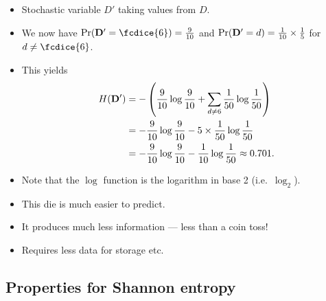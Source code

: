 \begin{frame}
  \begin{example}
    \begin{itemize}
      \item Stochastic variable \(D'\) taking values from \(D\).
      \item We now have \(\Pr(\stoch D' = \fcdice{6}) = \frac{9}{10}\) and 
        \(\Pr(\mathbf D' = d) = \frac{1}{10}\times\frac{1}{5}\) for \(d\neq 
          \fcdice{6}\).
      \item This yields
        \begin{align*}
          H(\mathbf D') &= -\left( \frac{9}{10}\log\frac{9}{10} + \sum_{d\neq 6} 
            \frac{1}{50}\log\frac{1}{50} \right) \\
          &= -\frac{9}{10}\log\frac{9}{10} -5\times\frac{1}{50}\log\frac{1}{50} 
          \\
          &= -\frac{9}{10}\log\frac{9}{10} -\frac{1}{10}\log\frac{1}{50} 
          \approx 0.701.
        \end{align*}
      \item Note that the \(\log\) function is the logarithm in base 2 (i.e.\ 
        \(\log_2\)).
    \end{itemize}
  \end{example}
\end{frame}

\begin{frame}
  \begin{remark}
    \begin{itemize}
      \item This die is much easier to predict.
      \item It produces much less information --- less than a coin toss!
      \item Requires less data for storage etc.
    \end{itemize}
  \end{remark}
\end{frame}

\subsection{Properties for Shannon entropy}

